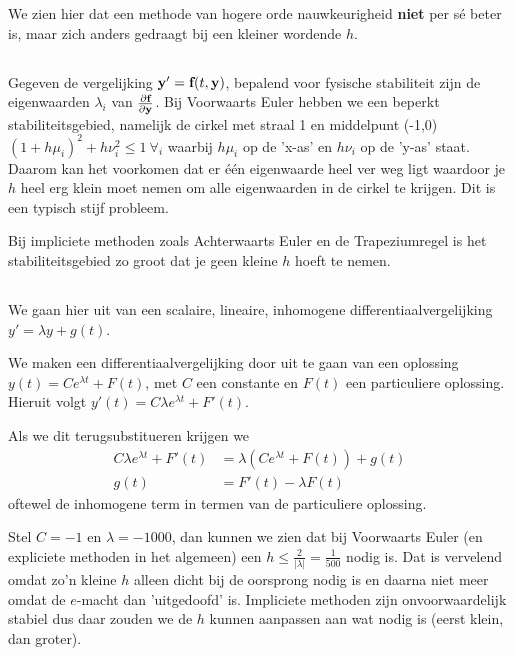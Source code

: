 \documentclass{2wn20summary}
\begin{document}
		  We zien hier dat een methode van hogere orde nauwkeurigheid \textbf{niet} per s\'e beter %
		   is, maar zich anders gedraagt bij een kleiner wordende $h$.
		  
	\subsection{}
		Gegeven de vergelijking ${\textbf{y}}'={\textbf{f}} (t,{\textbf{y}} )$, bepalend voor fysische stabiliteit zijn de eigenwaarden $\lambda_i$ van $\frac{\partial {\textbf{f}}  }{\partial {\textbf{y}} }$. Bij Voorwaarts Euler hebben we een beperkt stabiliteitsgebied, namelijk de cirkel met straal 1 en middelpunt (-1,0) $(1+h \mu_i)^2 +h \nu_i^2 \le 1\ \forall_i$ waarbij $h\mu_i$ op de 'x-as' en $h \nu_i$ op de 'y-as' staat. Daarom kan het voorkomen dat er \'e\'en eigenwaarde heel ver weg ligt waardoor je $h$ heel erg klein moet nemen om alle eigenwaarden in de cirkel te krijgen. Dit is een typisch stijf probleem.		  
		
		Bij impliciete methoden zoals Achterwaarts Euler en de Trapeziumregel is het stabiliteitsgebied zo groot dat je geen kleine $h$ hoeft te nemen.
		
	\subsection{}
	
		We gaan hier uit van een scalaire, lineaire, inhomogene differentiaalvergelijking $y'=\lambda y + g(t)$.
		
		We maken een differentiaalvergelijking door uit te gaan van een oplossing $y(t) = C e^{\lambda t} +F(t)$, met $C$ een constante en $F(t)$ een particuliere oplossing. Hieruit volgt $y'(t) = C\lambda e^{\lambda t} + F'(t)$.
		
		Als we dit terugsubstitueren krijgen we
		\begin{align*}
			C \lambda e^{\lambda t} + F'(t) &= \lambda (C e^{\lambda t} +F(t)) + g(t) \\
			g(t) &= F'(t) - \lambda F(t)
		\end{align*}
		oftewel de inhomogene term in termen van de particuliere oplossing.
		
		\begin{voorbeeld}
			Stel $C=-1$ en $\lambda = -1000$, dan kunnen we zien dat bij Voorwaarts Euler (en expliciete methoden in het algemeen) een $h\le \frac{2}{|\lambda|} = \frac{1}{500}$ nodig is. Dat is vervelend omdat zo'n kleine $h$ alleen dicht bij de oorsprong nodig is en daarna niet meer omdat de $e$-macht dan 'uitgedoofd' is. Impliciete methoden zijn onvoorwaardelijk stabiel dus daar zouden we de $h$ kunnen aanpassen aan wat nodig is (eerst klein, dan groter).
		\end{voorbeeld}
		
\end{document}
